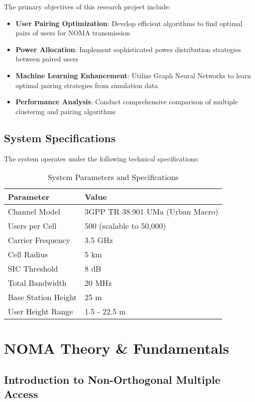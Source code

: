 \documentclass[11pt,a4paper]{article}
\begin{document}
The primary objectives of this research project include:

\begin{itemize}
    \item \textbf{User Pairing Optimization}: Develop efficient algorithms to find optimal pairs of users for NOMA transmission
    \item \textbf{Power Allocation}: Implement sophisticated power distribution strategies between paired users
    \item \textbf{Machine Learning Enhancement}: Utilize Graph Neural Networks to learn optimal pairing strategies from simulation data
    \item \textbf{Performance Analysis}: Conduct comprehensive comparison of multiple clustering and pairing algorithms
\end{itemize}

\subsection{System Specifications}

The system operates under the following technical specifications:

\begin{table}[H]
\centering
\begin{tabular}{@{}ll@{}}
\toprule
\textbf{Parameter} & \textbf{Value} \\
\midrule
Channel Model & 3GPP TR 38.901 UMa (Urban Macro) \\
Users per Cell & 500 (scalable to 50,000) \\
Carrier Frequency & 3.5 GHz \\
Cell Radius & 5 km \\
SIC Threshold & 8 dB \\
Total Bandwidth & 20 MHz \\
Base Station Height & 25 m \\
User Height Range & 1.5 - 22.5 m \\
\bottomrule
\end{tabular}
\caption{System Parameters and Specifications}
\label{tab:system_specs}
\end{table}

\section{NOMA Theory \& Fundamentals}

\subsection{Introduction to Non-Orthogonal Multiple Access}
\end{document}
